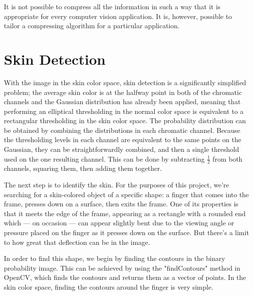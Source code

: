 It is not possible to compress all the information in such a way that it is appropriate for every computer vision application. It is, however, possible to tailor a compressing algorithm for a particular application.


\section{Skin Detection}\label{sec:SkinDetection}

With the image in the skin color space, skin detection is a significantly simplified problem; the average skin color is at the halfway point in both of the chromatic channels and the Gaussian distribution has already been applied, meaning that performing an elliptical thresholding in the normal color space is equivalent to a rectangular thresholding in the skin color space. The probability distribution can be obtained by combining the distributions in each chromatic channel. Because the thresholding levels in each channel are equivalent to the same points on the Gaussian, they can be straightforwardly combined, and then a single threshold used on the one resulting channel. This can be done by subtracting $\frac{1}{2}$ from both channels, squaring them, then adding them together.

The next step is to identify the skin. For the purposes of this project, we're searching for a skin-colored object of a specific shape: a finger that comes into the frame, presses down on a surface, then exits the frame. One of its properties is that it meets the edge of the frame, appearing as a rectangle with a rounded end which --- on occasion --- can appear slightly bent due to the viewing angle or pressure placed on the finger as it presses down on the surface. But there's a limit to how great that deflection can be in the image.

In order to find this shape, we begin by finding the contours in the binary probability image. This can be achieved by using the "findContours" method in OpenCV, which finds the contours and returns them as a vector of points. In the skin color space, finding the contours around the finger is very simple.

